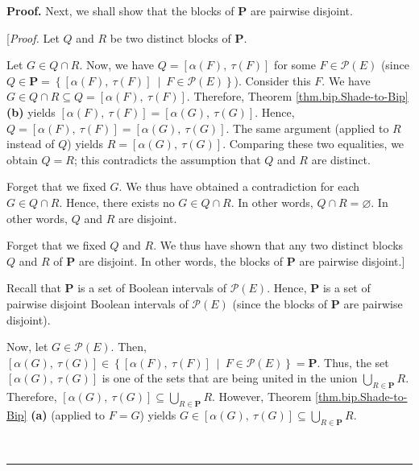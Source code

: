 \documentclass[numbers=enddot,12pt,final,onecolumn]{scrartcl}%
\theoremstyle{definition}
\newenvironment{proof}[1][Proof]{\noindent\textbf{#1.} }{\ \rule{0.5em}{0.5em}}
\let\cupnonlimits\bigcup
\renewcommand{\bigcup}{\cupnonlimits\limits}
\begin{document}
\begin{proof}
Next, we shall show that the blocks of $\mathbf{P}$ are pairwise disjoint.

[\textit{Proof.} Let $Q$ and $R$ be two distinct blocks of $\mathbf{P}$.

Let $G\in Q\cap R$. Now, we have $Q=\left[  \alpha\left(  F\right)
,\ \tau\left(  F\right)  \right]  $ for some $F\in\mathcal{P}\left(  E\right)
$ (since $Q\in\mathbf{P}=\left\{  \left[  \alpha\left(  F\right)
,\ \tau\left(  F\right)  \right]  \ \mid\ F\in\mathcal{P}\left(  E\right)
\right\}  $). Consider this $F$. We have $G\in Q\cap R\subseteq Q=\left[
\alpha\left(  F\right)  ,\ \tau\left(  F\right)  \right]  $. Therefore,
Theorem \ref{thm.bip.Shade-to-Bip} \textbf{(b)} yields $\left[  \alpha\left(
F\right)  ,\ \tau\left(  F\right)  \right]  =\left[  \alpha\left(  G\right)
,\ \tau\left(  G\right)  \right]  $. Hence, $Q=\left[  \alpha\left(  F\right)
,\ \tau\left(  F\right)  \right]  =\left[  \alpha\left(  G\right)
,\ \tau\left(  G\right)  \right]  $. The same argument (applied to $R$ instead
of $Q$) yields $R=\left[  \alpha\left(  G\right)  ,\ \tau\left(  G\right)
\right]  $. Comparing these two equalities, we obtain $Q=R$; this contradicts
the assumption that $Q$ and $R$ are distinct.

Forget that we fixed $G$. We thus have obtained a contradiction for each $G\in
Q\cap R$. Hence, there exists no $G\in Q\cap R$. In other words, $Q\cap
R=\varnothing$. In other words, $Q$ and $R$ are disjoint.

Forget that we fixed $Q$ and $R$. We thus have shown that any two distinct
blocks $Q$ and $R$ of $\mathbf{P}$ are disjoint. In other words, the blocks of
$\mathbf{P}$ are pairwise disjoint.]

Recall that $\mathbf{P}$ is a set of Boolean intervals of $\mathcal{P}\left(
E\right)  $. Hence, $\mathbf{P}$ is a set of pairwise disjoint Boolean
intervals of $\mathcal{P}\left(  E\right)  $ (since the blocks of $\mathbf{P}$
are pairwise disjoint).

Now, let $G\in\mathcal{P}\left(  E\right)  $. Then, $\left[  \alpha\left(
G\right)  ,\ \tau\left(  G\right)  \right]  \in\left\{  \left[  \alpha\left(
F\right)  ,\ \tau\left(  F\right)  \right]  \ \mid\ F\in\mathcal{P}\left(
E\right)  \right\}  =\mathbf{P}$. Thus, the set $\left[  \alpha\left(
G\right)  ,\ \tau\left(  G\right)  \right]  $ is one of the sets that are
being united in the union $\bigcup_{R\in\mathbf{P}}R$. Therefore, $\left[
\alpha\left(  G\right)  ,\ \tau\left(  G\right)  \right]  \subseteq
\bigcup_{R\in\mathbf{P}}R$. However, Theorem \ref{thm.bip.Shade-to-Bip}
\textbf{(a)} (applied to $F=G$) yields $G\in\left[  \alpha\left(  G\right)
,\ \tau\left(  G\right)  \right]  \subseteq\bigcup_{R\in\mathbf{P}}R$.


\end{proof}
\end{document}
